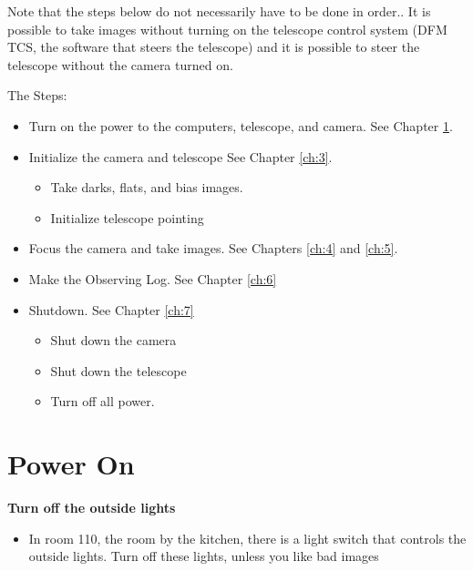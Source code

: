 \documentclass[letterpaper, 12pt]{report}
\begin{document}
Note that the steps below do not necessarily have to be done in order.. It is possible to take images without turning on the telescope control system (DFM TCS, the software that steers the telescope) and it is possible to steer the telescope without the camera turned on.

The Steps:
\begin{itemize}
	\item Turn on the power to the computers, telescope, and camera. See Chapter \ref{ch:2}.
	\item Initialize the camera and telescope See Chapter \ref{ch:3}.
	\begin{itemize}
		\item Take darks, flats, and bias images.
		\item Initialize telescope pointing
	\end{itemize}
	\item Focus the camera and take images. See Chapters \ref{ch:4} and \ref{ch:5}.
	\item Make the Observing Log. See Chapter \ref{ch:6} 
	\item Shutdown. See Chapter \ref{ch:7}
	\begin{itemize}
		\item Shut down the camera
		\item Shut down the telescope
		\item Turn off all power.
	\end{itemize}
\end{itemize}

\newpage

\chapter{Power On}\label{ch:2}

\textbf{Turn off the outside lights}
\begin{itemize}
	\item In room 110, the room by the kitchen, there is a light switch that controls the outside lights. Turn off these lights, unless you like bad images
\end{itemize}
\end{document}
